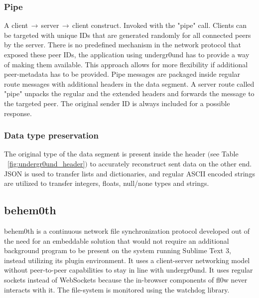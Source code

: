 \documentclass[conference]{IEEEtran}
\begin{document}
\subsubsection{Pipe}
A client$\,\to\,$server$\,\to\,$client construct. Invoked with the {\color{deepgreen}"pipe"} call. Clients can be targeted with unique IDs that are generated randomly for all connected peers by the server. There is no predefined mechanism in the network protocol that exposed these peer IDs, the application using undergr0und\cite{undergr0und:Philip Trauner} has to provide a way of making them available. This approach allows for more flexibility if additional peer-metadata has to be provided. Pipe messages are packaged inside regular route messages with additional headers in the data segment. A server route called {\color{deepgreen}"pipe"} unpacks the regular and the extended headers and forwards the message to the targeted peer. The original sender ID is always included for a possible response.\\

\subsubsection{Data type preservation}
The original type of the data segment is present inside the header $($see Table ~\ref{fig:undergr0und_header}$)$ to accurately reconstruct sent data on the other end. JSON\cite{JSON:T. Bray Ed.} is used to transfer lists and dictionaries, and regular ASCII encoded strings are utilized to transfer integers, floats, null/none types and strings.

\subsection{behem0th}
behem0th\cite{behem0th:Christoph Heiss} is a continuous network file synchronization protocol developed out of the need for an embeddable solution that would not require an additional background program to be present on the system running Sublime Text 3\cite{Sublime Text 3:Sublime HQ}, instead utilizing its plugin environment. It uses a client-server networking model without peer-to-peer capabilities to stay in line with undergr0und. It uses regular sockets instead of WebSockets\cite{The WebSocket Protocol:A. Melnikov} because the in-browser components of fl0w\cite{fl0w:Philip Trauner} never interacts with it. The file-system is monitored using the watchdog\cite{watchdog:Yesudeep Mangalapilly} library.\\
\end{document}
